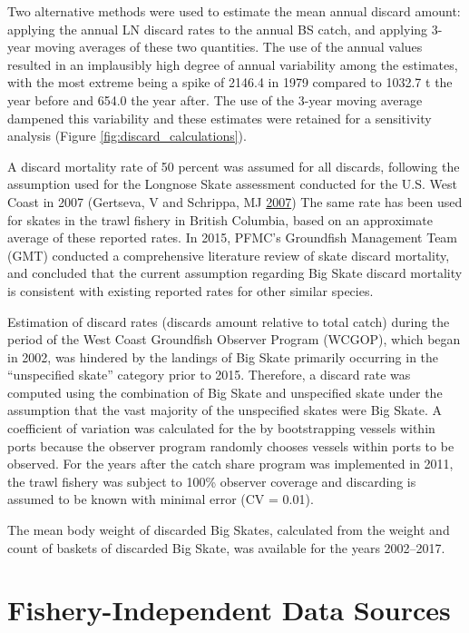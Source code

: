 \documentclass[12pt,]{article}
\begin{document}
Two alternative methods were used to estimate the mean annual discard
amount: applying the annual LN discard rates to the annual BS catch, and
applying 3-year moving averages of these two quantities. The use of the
annual values resulted in an implausibly high degree of annual
variability among the estimates, with the most extreme being a spike of
2146.4 in 1979 compared to 1032.7 t the year before and 654.0 the year
after. The use of the 3-year moving average dampened this variability
and these estimates were retained for a sensitivity analysis (Figure
\ref{fig:discard_calculations}).

A discard mortality rate of 50 percent was assumed for all discards,
following the assumption used for the Longnose Skate assessment
conducted for the U.S. West Coast in 2007 (Gertseva, V and Schrippa, MJ
\protect\hyperlink{ref-Gertseva2007}{2007}) The same rate has been used
for skates in the trawl fishery in British Columbia, based on an
approximate average of these reported rates. In 2015, PFMC's Groundfish
Management Team (GMT) conducted a comprehensive literature review of
skate discard mortality, and concluded that the current assumption
regarding Big Skate discard mortality is consistent with existing
reported rates for other similar species.

Estimation of discard rates (discards amount relative to total catch)
during the period of the West Coast Groundfish Observer Program (WCGOP),
which began in 2002, was hindered by the landings of Big Skate primarily
occurring in the ``unspecified skate'' category prior to 2015.
Therefore, a discard rate was computed using the combination of Big
Skate and unspecified skate under the assumption that the vast majority
of the unspecified skates were Big Skate. A coefficient of variation was
calculated for the by bootstrapping vessels within ports because the
observer program randomly chooses vessels within ports to be observed.
For the years after the catch share program was implemented in 2011, the
trawl fishery was subject to 100\% observer coverage and discarding is
assumed to be known with minimal error (CV = 0.01).

The mean body weight of discarded Big Skates, calculated from the weight
and count of baskets of discarded Big Skate, was available for the years
2002--2017.

\hypertarget{fishery-independent-data-sources}{%
\section{Fishery-Independent Data
Sources}\label{fishery-independent-data-sources}}
\end{document}
